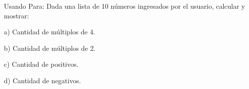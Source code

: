 ﻿
Usando Para: Dada una lista de 10 números ingresados por el usuario, calcular y mostrar:

a) Cantidad de múltiplos de 4.

b) Cantidad de múltiplos de 2.

c) Cantidad de positivos.

d) Cantidad de negativos.



\volverindice
\newpage
